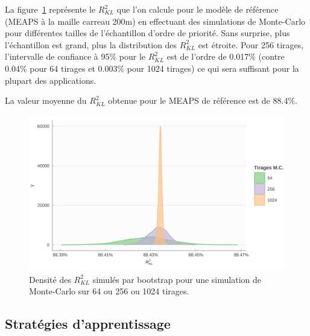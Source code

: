 \documentclass[
  10pt,
  a4paper,
  numbers=noendperiod,
  DIV=9]{scrartcl}
\begin{document}
La figure~\ref{fig-reflr} représente le \(R^2_{KL}\) que l'on calcule
pour le modèle de référence (MEAPS à la maille carreau 200m) en
effectuant des simulations de Monte-Carlo pour différentes tailles de
l'échantillon d'ordre de priorité. Sans surprise, plus l'échantillon est
grand, plus la distribution des \(R^2_{KL}\) est étroite. Pour 256
tirages, l'intervalle de confiance à 95\% pour le \(R^2_{KL}\) est de
l'ordre de 0.017\% (contre 0.04\% pour 64 tirages et 0.003\% pour 1024
tirages) ce qui sera suffisant pour la plupart des applications.

La valeur moyenne du \(R^2_{KL}\) obtenue pour le MEAPS de référence est
de 88.4\%.

\begin{figure}[htb]

{\centering \includegraphics[width=1\textwidth,height=\textheight]{larochelle_files/figure-pdf/fig-reflr-1.png}

}

\caption{\label{fig-reflr}Densité des \(R^2_{KL}\) simulés par bootstrap
pour une simulation de Monte-Carlo sur 64 ou 256 ou 1024 tirages.}

\end{figure}

\hypertarget{sec-estnp}{%
\subsection{Stratégies d'apprentissage}\label{sec-estnp}}
\end{document}
